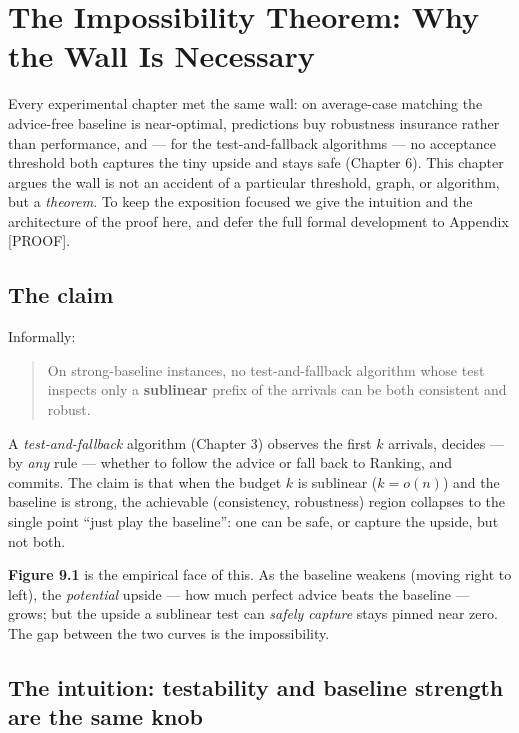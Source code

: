 \chapter{The Impossibility Theorem: Why the Wall Is Necessary}\label{the-impossibility-theorem-why-the-wall-is-necessary}

Every experimental chapter met the same wall: on average-case matching the advice-free
baseline is near-optimal, predictions buy robustness insurance rather than performance, and
--- for the test-and-fallback algorithms --- no acceptance threshold both captures the tiny
upside and stays safe (Chapter 6). This chapter argues the wall is not an accident of a
particular threshold, graph, or algorithm, but a \emph{theorem}. To keep the exposition focused
we give the intuition and the architecture of the proof here, and defer the full formal
development to Appendix {[}PROOF{]}.

\section{The claim}\label{the-claim}

Informally:

\begin{quote}
On strong-baseline instances, no test-and-fallback algorithm whose test inspects only a
\textbf{sublinear} prefix of the arrivals can be both consistent and robust.
\end{quote}

A \emph{test-and-fallback} algorithm (Chapter 3) observes the first \(k\) arrivals, decides --- by
\emph{any} rule --- whether to follow the advice or fall back to Ranking, and commits. The claim is
that when the budget \(k\) is sublinear (\(k=o(n)\)) and the baseline is strong, the achievable
(consistency, robustness) region collapses to the single point ``just play the baseline'':
one can be safe, or capture the upside, but not both.

\textbf{Figure 9.1} is the empirical face of this. As the baseline weakens (moving right to
left), the \emph{potential} upside --- how much perfect advice beats the baseline --- grows; but the
upside a sublinear test can \emph{safely capture} stays pinned near zero. The gap between the two
curves is the impossibility.

\section{The intuition: testability and baseline strength are the same knob}\label{the-intuition-testability-and-baseline-strength-are-the-same-knob}

